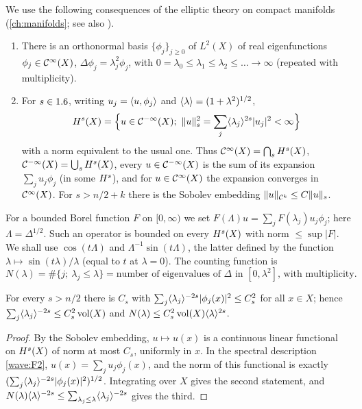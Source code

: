 We use the following consequences of the elliptic theory on compact manifolds
(\cref{ch:manifolds}; see also \cite{Shubin}).
\begin{enumerate}[label=(F\arabic*)]
\item\label{wave:F1} There is an orthonormal basis $\{\phi_j\}_{j\ge0}$ of
  $L^2(X)$ of real eigenfunctions $\phi_j\in\mathcal{C}^\infty(X)$, $\Delta\phi_j=\lambda_j^2\phi_j$,
  with $0=\lambda_0\le\lambda_1\le\lambda_2\le\dots\to\infty$ (repeated with
  multiplicity).
\item\label{wave:F2} For $s\in1.6$, writing $u_j=\langle u, \phi_j\rangle$ and
  $\langle \lambda\rangle=(1+\lambda^2)^{1/2}$,
  \begin{equation*}
  \Hs{s}(X)=\Big\{u\in\CmI(X);\ \norm{u}_s^2=\sum_j\ang{\lambda_j}^{2s}|u_j|^2<\infty\Big\}
  \end{equation*}
  with a norm equivalent to the usual one. Thus $\mathcal{C}^\infty(X)=\bigcap_sH^{s}(X)$,
  $\mathcal{C}^{-\infty}(X)=\bigcup_sH^{s}(X)$, every $u\in\mathcal{C}^{-\infty}(X)$ is the sum of its expansion
  $\sum_ju_j\phi_j$ (in some $H^{s}$), and for $u\in\mathcal{C}^\infty(X)$ the expansion
  converges in $\mathcal{C}^\infty(X)$. For $s>n/2+k$ there is the Sobolev embedding
  $\lVert u\rVert_{\mathcal C^k}\le C\lVert u\rVert_s$.
\end{enumerate}
For a bounded Borel function $F$ on $[0,\infty)$ we set
$F(\Lambda)u=\sum_jF(\lambda_j)u_j\phi_j$; here $\Lambda=\Delta^{1/2}$. Such an
operator is bounded on every $H^{s}(X)$ with norm $\le\sup|F|$. We shall use
$\cos(t\Lambda)$ and $\Lambda^{-1}\sin(t\Lambda)$, the latter defined by the
function $\lambda\mapsto\sin(t\lambda)/\lambda$ (equal to $t$ at $\lambda=0$).
The counting function is
\begin{equation*}
N(\lambda)=\#\{j;\ \lambda_j\le\lambda\}
=\text{number of eigenvalues of $\Delta$ in $[0,\lambda^2]$, with multiplicity.}
\end{equation*}

\begin{lemma}\label{wave:lem:apriori}
For every $s>n/2$ there is $C_s$ with
$\sum_j\langle \lambda_j\rangle^{-2s}|\phi_j(x)|^2\le C_s^2$ for all $x\in X$; hence
$\sum_j\langle \lambda_j\rangle^{-2s}\le C_s^2\operatorname{vol}(X)$ and
$N(\lambda)\le C_s^2\operatorname{vol}(X)\langle \lambda\rangle^{2s}$.
\end{lemma}
\begin{proof}
By the Sobolev embedding, $u\mapsto u(x)$ is a continuous linear functional on
$H^{s}(X)$ of norm at most $C_s$, uniformly in $x$. In the spectral description
\ref{wave:F2}, $u(x)=\sum_ju_j\phi_j(x)$, and the norm of this functional is
exactly $(\sum_j\langle \lambda_j\rangle^{-2s}|\phi_j(x)|^2)^{1/2}$. Integrating over $X$
gives the second statement, and $N(\lambda)\langle \lambda\rangle^{-2s}\le\sum_{\lambda_j\le\lambda}\langle \lambda_j\rangle^{-2s}$
gives the third.
\end{proof}

